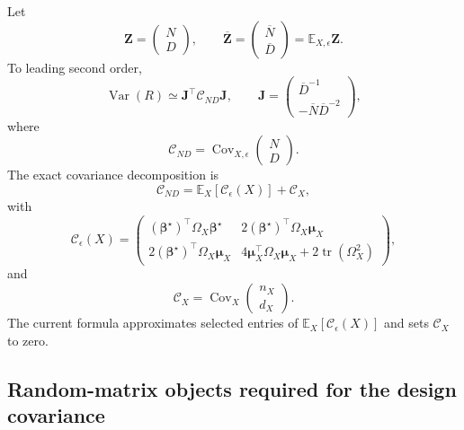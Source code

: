 \documentclass[11pt]{article}
\newcommand{\E}{\mathbb{E}}
\newcommand{\Var}{\operatorname{Var}}
\newcommand{\Cov}{\operatorname{Cov}}
\newcommand{\tr}{\operatorname{tr}}
\newcommand{\bstar}{\bm\beta^\star}
\begin{document}
Let
\begin{equation}
  \bm Z=
  \begin{pmatrix}N\\D\end{pmatrix},\qquad
  \overline{\bm Z}=
  \begin{pmatrix}\overline N\\\overline D\end{pmatrix}
  =
  \E_{X,\epsilon}\bm Z.
\end{equation}
To leading second order,
\begin{equation}
  \Var(R)
  \simeq
  \bm J^\top\mathcal C_{ND}\bm J,
  \qquad
  \bm J=
  \begin{pmatrix}
    \overline D^{-1}\\
    -\overline N\overline D^{-2}
  \end{pmatrix},
  \label{eq:full-delta}
\end{equation}
where
\begin{equation}
  \mathcal C_{ND}
  =
  \Cov_{X,\epsilon}
  \begin{pmatrix}N\\D\end{pmatrix}.
\end{equation}
The exact covariance decomposition is
\begin{equation}
\boxed{
  \mathcal C_{ND}
  =
  \E_X[\mathcal C_{\epsilon}(X)]
  +
  \mathcal C_X,
}
\label{eq:covariance-decomposition}
\end{equation}
with
\begin{equation}
  \mathcal C_{\epsilon}(X)
  =
  \begin{pmatrix}
    (\bstar)^\top\Omega_X\bstar
    &
    2(\bstar)^\top\Omega_X\bm\mu_X\\
    2(\bstar)^\top\Omega_X\bm\mu_X
    &
    4\bm\mu_X^\top\Omega_X\bm\mu_X
      +2\tr(\Omega_X^2)
  \end{pmatrix},
  \label{eq:conditional-cov-matrix}
\end{equation}
and
\begin{equation}
  \mathcal C_X
  =
  \Cov_X
  \begin{pmatrix}
    n_X\\d_X
  \end{pmatrix}.
  \label{eq:design-cov-matrix}
\end{equation}
The current formula approximates selected entries of
\(\E_X[\mathcal C_{\epsilon}(X)]\) and sets
\(\mathcal C_X\) to zero.

\subsection{Random-matrix objects required for the design covariance}
\end{document}

